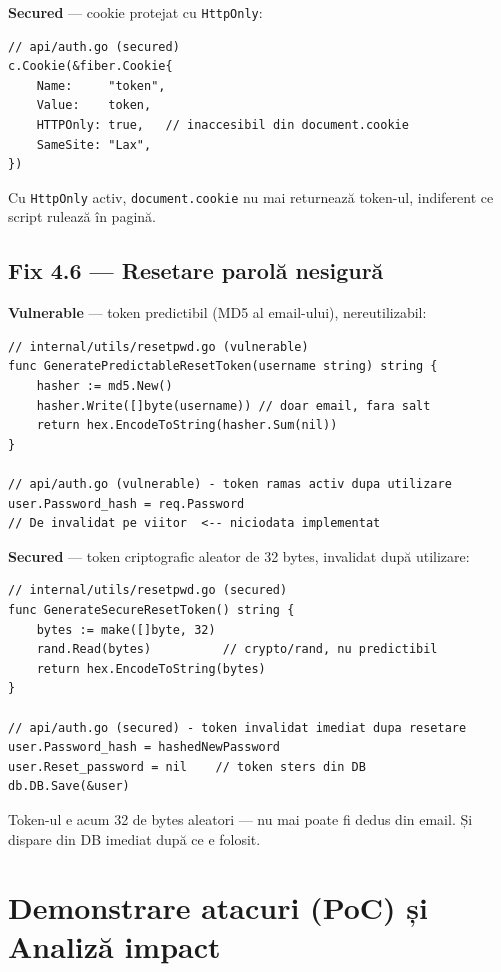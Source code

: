 \documentclass[12pt]{article}
\begin{document}
\textbf{Secured} --- cookie protejat cu \texttt{HttpOnly}:
\begin{lstlisting}[language={}]
// api/auth.go (secured)
c.Cookie(&fiber.Cookie{
    Name:     "token",
    Value:    token,
    HTTPOnly: true,   // inaccesibil din document.cookie
    SameSite: "Lax",
})
\end{lstlisting}

Cu \texttt{HttpOnly} activ, \texttt{document.cookie} nu mai returnează token-ul, indiferent ce script rulează în pagină.

\subsection{Fix 4.6 --- Resetare parolă nesigură}

\textbf{Vulnerable} --- token predictibil (MD5 al email-ului), nereutilizabil:
\begin{lstlisting}[language={}]
// internal/utils/resetpwd.go (vulnerable)
func GeneratePredictableResetToken(username string) string {
    hasher := md5.New()
    hasher.Write([]byte(username)) // doar email, fara salt
    return hex.EncodeToString(hasher.Sum(nil))
}

// api/auth.go (vulnerable) - token ramas activ dupa utilizare
user.Password_hash = req.Password
// De invalidat pe viitor  <-- niciodata implementat
\end{lstlisting}

\textbf{Secured} --- token criptografic aleator de 32 bytes, invalidat după utilizare:
\begin{lstlisting}[language={}]
// internal/utils/resetpwd.go (secured)
func GenerateSecureResetToken() string {
    bytes := make([]byte, 32)
    rand.Read(bytes)          // crypto/rand, nu predictibil
    return hex.EncodeToString(bytes)
}

// api/auth.go (secured) - token invalidat imediat dupa resetare
user.Password_hash = hashedNewPassword
user.Reset_password = nil    // token sters din DB
db.DB.Save(&user)
\end{lstlisting}

Token-ul e acum 32 de bytes aleatori --- nu mai poate fi dedus din email. Și dispare din DB imediat după ce e folosit.


\newpage
\section{Demonstrare atacuri (PoC) și Analiză impact}
\end{document}
